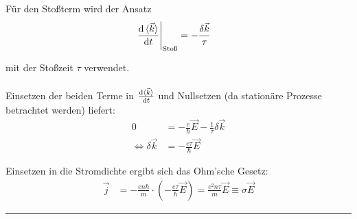 \documentclass{article}
\newcommand{\diff}{\mathrm{d}}
\newcommand{\lr}[1]{\left(#1\right)}
\begin{document}
{	Für den Stoßterm wird der Ansatz
		\begin{align*}
			\left. \frac{\diff \braket{\vec{k}}}{\diff t} \right|_\text{Stoß} &= -\frac{\delta\vec{k}}{\tau}
		\end{align*}
	
	mit der Stoßzeit $\tau$ verwendet.\\
	\\
	Einsetzen der beiden Terme in $\frac{\diff\braket{\vec{k}}}{\diff t}$ und Nullsetzen (da stationäre Prozesse betrachtet werden) liefert:
		\begin{align*}
			0 &= -\frac{e}{\hbar} \vec{E} - \frac{1}{\tau} \delta\vec{k} \\
			\Leftrightarrow \delta\vec{k} &= -\frac{e\tau}{\hbar} \vec{E}
		\end{align*}
	
	Einsetzen in die Stromdichte ergibt sich das Ohm'sche Gesetz:
		\begin{align*}
			\vec{j} &= -\frac{e n \hbar}{m} \cdot \lr{ - \frac{e\tau}{\hbar} \vec{E} } = \frac{e^2 n \tau}{m} \vec{E} \equiv \sigma \vec{E}
		\end{align*}
\hrule
}


\newpage
\end{document}
